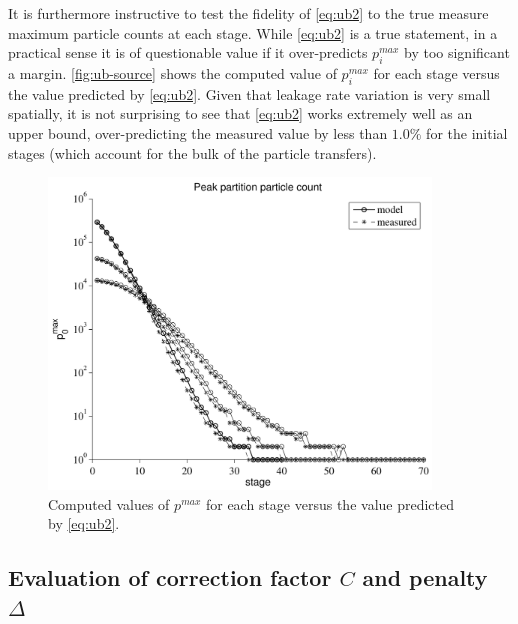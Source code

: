It is furthermore instructive to test the fidelity of \eqref{eq:ub2} to the true
measure maximum particle counts at each stage. While \eqref{eq:ub2} is a true
statement, in a practical sense it is of questionable value if it over-predicts
$p^{max}_i$ by too significant a margin. \autoref{fig:ub-source} shows the
computed value of $p^{max}_i$ for each stage versus the value predicted by
\eqref{eq:ub2}. Given that leakage rate variation is very small spatially, it is
not surprising to see that \eqref{eq:ub2} works extremely well as an upper
bound, over-predicting the measured value by less than $1.0\%$ for the initial
stages (which account for the bulk of the particle transfers).
\begin{figure}[ht!]
  \centering
  \includegraphics[width=4.0in]{figures/ch5/ub_source.pdf}
  \caption{Computed values of $p^{max}$ for each stage versus the value
    predicted by \eqref{eq:ub2}.}
  \label{fig:ub-source}
\end{figure}

\subsection{Evaluation of correction factor $C$ and penalty \texorpdfstring{$\Delta$}{Delta}}

